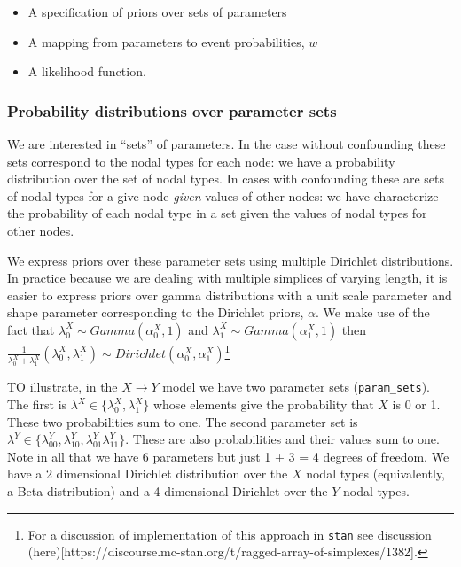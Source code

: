 \documentclass[
  11pt,
  article]{jss}
\providecommand{\tightlist}{%
  \setlength{\itemsep}{0pt}\setlength{\parskip}{0pt}}\usepackage{longtable,booktabs,array}
\begin{document}
\begin{itemize}
\tightlist
\item
  A specification of priors over sets of parameters
\item
  A mapping from parameters to event probabilities, \(w\)
\item
  A likelihood function.
\end{itemize}

\hypertarget{probability-distributions-over-parameter-sets}{%
\subsubsection{Probability distributions over parameter
sets}\label{probability-distributions-over-parameter-sets}}

We are interested in ``sets'' of parameters. In the case without
confounding these sets correspond to the nodal types for each node: we
have a probability distribution over the set of nodal types. In cases
with confounding these are sets of nodal types for a give node
\emph{given} values of other nodes: we have characterize the probability
of each nodal type in a set given the values of nodal types for other
nodes.

We express priors over these parameter sets using multiple Dirichlet
distributions. In practice because we are dealing with multiple
simplices of varying length, it is easier to express priors over gamma
distributions with a unit scale parameter and shape parameter
corresponding to the Dirichlet priors, \(\alpha\). We make use of the
fact that \(\lambda^X_0 \sim Gamma(\alpha^X_0,1)\) and
\(\lambda^X_1 \sim Gamma(\alpha^X_1,1)\) then
\(\frac{1}{\lambda^X_0 +\lambda^X_1}(\lambda^X_0, \lambda^X_1) \sim Dirichlet(\alpha^X_0, \alpha^X_1)\)\footnote{For
  a discussion of implementation of this approach in \texttt{stan} see
  discussion
  (here){[}https://discourse.mc-stan.org/t/ragged-array-of-simplexes/1382{]}.}

TO illustrate, in the \(X \rightarrow Y\) model we have two parameter
sets (\texttt{param\_sets}). The first is
\(\lambda^X \in \{\lambda^X_0, \lambda^X_1\}\) whose elements give the
probability that \(X\) is 0 or 1. These two probabilities sum to one.
The second parameter set is
\(\lambda^Y \in \{\lambda^Y_{00}, \lambda^Y_{10}, \lambda^Y_{01} \lambda^Y_{11}\}\).
These are also probabilities and their values sum to one. Note in all
that we have 6 parameters but just 1 + 3 = 4 degrees of freedom. We have
a 2 dimensional Dirichlet distribution over the \(X\) nodal types
(equivalently, a Beta distribution) and a 4 dimensional Dirichlet over
the \(Y\) nodal types.
\end{document}
